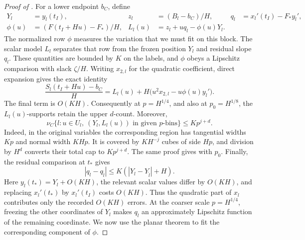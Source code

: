 \begin{proof}[Proof of ]
For a lower endpoint \(b_C\), define
\begin{align*}
 Y_l&=y_l(t_I),&
 z_l&=(B_l-b_C)/H,&
 q_l&=x_l'(t_I)-F_*y_l',\\
 \phi(u)&=(F(t_I+Hu)-F_*)/H,&
 L_l(u)&=z_l+u q_l-\phi(u)Y_l.
\end{align*}
The normalized row \(\phi\) measures the variation that we must fit
on this block.  The scalar model \(L_l\) separates that row from the
frozen position \(Y_l\) and residual slope \(q_l\).
These quantities are bounded by \(K\) on the labels, and \(\phi\) obeys
a Lipschitz comparison with slack \(\zeta/H\).
Writing \(x_{2,l}\) for the quadratic coefficient, direct expansion gives
the exact identity
\begin{equation}\label{a04:quadratic-local-error}
 \frac{S_l(t_I+Hu)-b_C}{H}
 =L_l(u)+H\bigl(u^2x_{2,l}-u\phi(u)y_l'\bigr).
\end{equation}
The final term is \(O(KH)\).
Consequently at \(p=H^{1/4}\), and also at \(p_0=H^{1/8}\), the
\(L_l(u)\)-supports retain the upper \(d\)-count.
Moreover,
\begin{equation}\label{a04:local-joint-cap}
 \nu_C\{l:u\in U_l,\ (Y_l,L_l(u))\text{ in given }p\text{-bins}\}
       \le Kp^{j+d}.
\end{equation}
Indeed, in the original variables the corresponding region has
tangential widths \(Kp\) and normal width \(KHp\).  It is covered by
\(KH^{-j}\) cubes of side \(Hp\), and division by \(H^d\) converts their
total cap to \(Kp^{j+d}\).
The same proof gives  with \(p_0\).
Finally, the residual comparison at \(t_*\) gives
\begin{equation}\label{a04:frozen-q-comparison}
 |q_l-q_{\tilde l}|
       \le K(|Y_l-Y_{\tilde l}|+H).
\end{equation}
Here \(y_l(t_*)=Y_l+O(KH)\), the relevant scalar values differ by
\(O(KH)\), and replacing \(x_l'(t_*)\) by \(x_l'(t_I)\) costs \(O(KH)\).
Thus the quadratic part of \(x_l\) contributes only the recorded
\(O(KH)\) errors.  At the coarser scale \(p=H^{1/4}\), freezing the
other coordinates of \(Y_l\) makes \(q_l\) an approximately Lipschitz
function of the remaining coordinate.  We now use the planar theorem
to fit the corresponding component of \(\phi\).


\end{proof}
